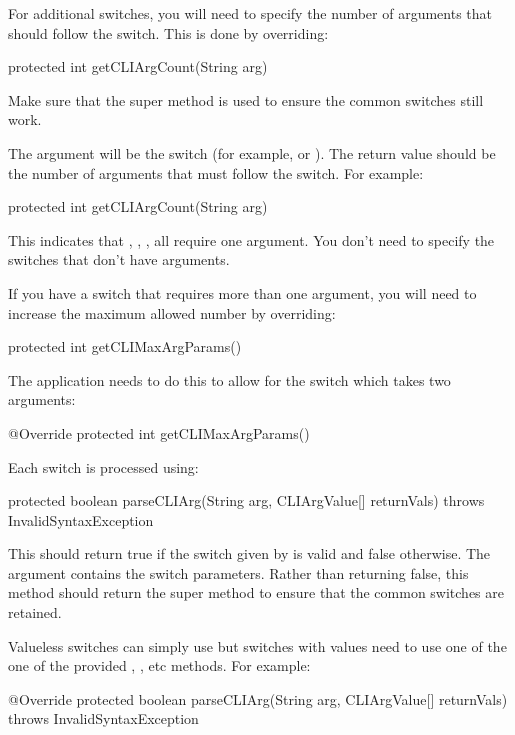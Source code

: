 \documentclass[toc=listof]{scrreport}
\newcommand\TJHZHswitch[1]{\switch{tjhziphelpset.#1}}
\begin{document}
For additional switches, you will need to specify the number of
arguments that should follow the switch. This is done by overriding:
\begin{codebox}
protected int getCLIArgCount(String arg)
\end{codebox}
Make sure that the super method is used to ensure the common
switches still work.

The  argument will be the switch (for example, 
 or ). The return value should be the
number of arguments that must follow the switch. For example:
\begin{codebox}
protected int getCLIArgCount(String arg)
\end{codebox}
This indicates that , ,
,  all require one argument.
You don't need to specify the switches that don't have arguments.

If you have a switch that requires more than one argument, you will
need to increase the maximum allowed number by overriding:
\begin{codebox}
protected int getCLIMaxArgParams()
\end{codebox}
The  application needs to do this to allow for
the \TJHZHswitch{license-file} switch which takes two arguments:
\begin{codebox}
@Override
protected int getCLIMaxArgParams()
\end{codebox}

Each switch is processed using:
\begin{codebox}
protected boolean parseCLIArg(String arg, CLIArgValue[] returnVals)
  throws InvalidSyntaxException
\end{codebox}
This should return true if the switch given by  is valid
and false otherwise. The  argument contains the
switch parameters. Rather than returning false, this method should
return the super method to ensure that the common switches are
retained.

Valueless switches can simply use 
but switches with values need to use one of the one of the provided 
, ,  etc methods.
For example:
\begin{codebox}
@Override
protected boolean parseCLIArg(String arg, CLIArgValue[] returnVals)
throws InvalidSyntaxException
\end{codebox}
\end{document}

